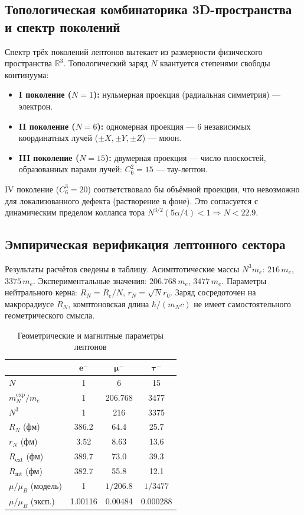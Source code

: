 \documentclass[11pt,a4paper]{article}
\begin{document}
	\subsection{Топологическая комбинаторика 3D-пространства и спектр поколений}
	Спектр трёх поколений лептонов вытекает из размерности физического пространства $\mathbb{R}^3$. Топологический заряд $N$ квантуется степенями свободы континуума:
	\begin{itemize}
		\item \textbf{I поколение ($N=1$):} нульмерная проекция (радиальная симметрия) — электрон.
		\item \textbf{II поколение ($N=6$):} одномерная проекция — 6 независимых координатных лучей ($\pm X,\pm Y,\pm Z$) — мюон.
		\item \textbf{III поколение ($N=15$):} двумерная проекция — число плоскостей, образованных парами лучей: $C_6^2=15$ — тау-лептон.
	\end{itemize}
	IV поколение ($C_6^3=20$) соответствовало бы объёмной проекции, что невозможно для локализованного дефекта (растворение в фоне). Это согласуется с динамическим пределом коллапса тора $N^{3/2}(5\alpha/4)<1 \Rightarrow N<22.9$.
	
	\subsection{Эмпирическая верификация лептонного сектора}
	Результаты расчётов сведены в таблицу. Асимптотические массы $N^3 m_e$: $216\,m_e$, $3375\,m_e$. Экспериментальные значения: $206.768\,m_e$, $3477\,m_e$. Параметры нейтрального керна: $R_N=R_e/N$, $r_N=\sqrt{N}r_0$. Заряд сосредоточен на макрорадиусе $R_N$, комптоновская длина $\hbar/(m_N c)$ не имеет самостоятельного геометрического смысла.
	
	\begin{table}[htbp]
		\centering
		\caption{Геометрические и магнитные параметры лептонов}
		\begin{tabular}{lccc}
			\toprule
			& $\bm{e^-}$ & $\bm{\mu^-}$ & $\bm{\tau^-}$ \\
			\midrule
			$N$ & 1 & 6 & 15 \\
			$m_N^{\text{exp}}/m_e$ & 1 & 206.768 & 3477 \\
			$N^3$ & 1 & 216 & 3375 \\
			$R_N$ (фм) & 386.2 & 64.4 & 25.7 \\
			$r_N$ (фм) & 3.52 & 8.63 & 13.6 \\
			$R_{\text{ext}}$ (фм) & 389.7 & 73.0 & 39.3 \\
			$R_{\text{int}}$ (фм) & 382.7 & 55.8 & 12.1 \\
			$\mu/\mu_B$ (модель) & 1 & $1/206.8$ & $1/3477$ \\
			$\mu/\mu_B$ (эксп.) & 1.00116 & 0.00484 & 0.000288 \\
			\bottomrule
		\end{tabular}
		\label{tab:leptons}
	\end{table}
	
\end{document}
